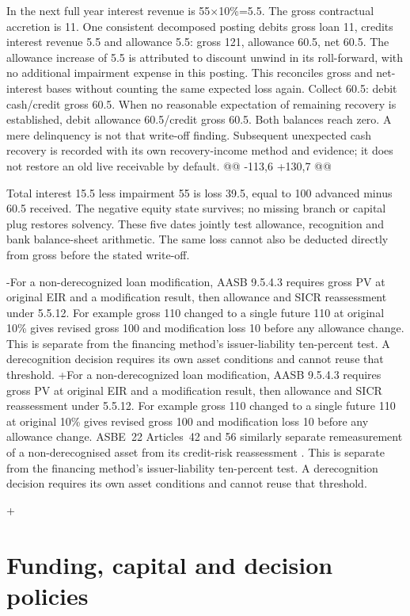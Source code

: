  In the next full year interest revenue is 55\ensuremath{\times}10\%=5.5. The gross contractual accretion is 11. One consistent decomposed posting debits gross loan 11, credits interest revenue 5.5 and allowance 5.5: gross 121, allowance 60.5, net 60.5. The allowance increase of 5.5 is attributed to discount unwind in its roll-forward, with no additional impairment expense in this posting. This reconciles gross and net-interest bases without counting the same expected loss again. Collect 60.5: debit cash/credit gross 60.5. When no reasonable expectation of remaining recovery is established, debit allowance 60.5/credit gross 60.5. Both balances reach zero. A mere delinquency is not that write-off finding. Subsequent unexpected cash recovery is recorded with its own recovery-income method and evidence; it does not restore an old live receivable by default.
@@ -113,6 +130,7 @@

 Total interest 15.5 less impairment 55 is loss 39.5, equal to 100 advanced minus 60.5 received. The negative equity state survives; no missing branch or capital plug restores solvency. These five dates jointly test allowance, recognition and bank balance-sheet arithmetic. The same loss cannot also be deducted directly from gross before the stated write-off.
 
-For a non-derecognized loan modification, AASB 9.5.4.3 requires gross PV at original EIR and a modification result, then allowance and SICR reassessment under 5.5.12. For example gross 110 changed to a single future 110 at original 10\% gives revised gross 100 and modification loss 10 before any allowance change. This is separate from the financing method's issuer-liability ten-percent test. A derecognition decision requires its own asset conditions and cannot reuse that threshold.
+For a non-derecognized loan modification, AASB 9.5.4.3 requires gross PV at original EIR and a modification result, then allowance and SICR reassessment under 5.5.12. For example gross 110 changed to a single future 110 at original 10\% gives revised gross 100 and modification loss 10 before any allowance change. ASBE~22 Articles~42 and 56 similarly separate remeasurement of a non-derecognised asset from its credit-risk reassessment \citep{mofasbe22}. This is separate from the financing method's issuer-liability ten-percent test. A derecognition decision requires its own asset conditions and cannot reuse that threshold.
 
+\newpage
 \hypertarget{funding-capital-and-decision-policies}{%
 \section{Funding, capital and decision policies}\label{method-bank-methods-funding-capital-and-decision-policies}}
